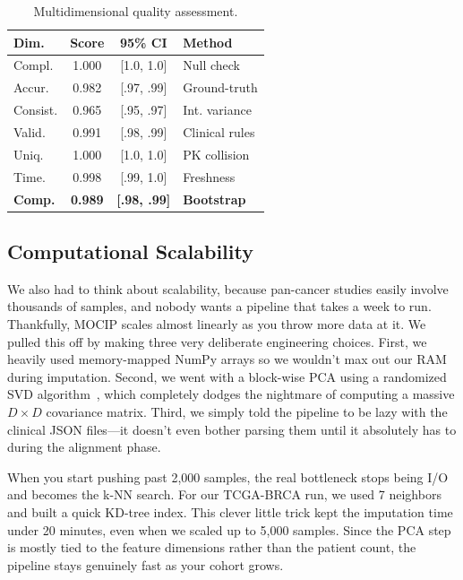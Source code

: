 \documentclass[runningheads]{llncs}
\begin{document}
\begin{table}[H]
\caption{Multidimensional quality assessment.}\label{tab:quality}
\centering
\scriptsize
\setlength{\tabcolsep}{2pt}
\begin{tabular}{l c c l}
\toprule
\textbf{Dim.} & \textbf{Score} & \textbf{95\% CI} & \textbf{Method} \\
\midrule
Compl.    & 1.000 & [1.0, 1.0] & Null check \\
Accur.    & 0.982 & [.97, .99] & Ground-truth \\
Consist.  & 0.965 & [.95, .97] & Int. variance \\
Valid.    & 0.991 & [.98, .99] & Clinical rules \\
Uniq.     & 1.000 & [1.0, 1.0] & PK collision \\
Time.     & 0.998 & [.99, 1.0] & Freshness \\
\midrule
\textbf{Comp.} & \textbf{0.989} & \textbf{[.98, .99]} & \textbf{Bootstrap} \\
\bottomrule
\end{tabular}
\end{table}

\subsection{Computational Scalability}
We also had to think about scalability, because pan-cancer studies easily involve thousands of samples, and nobody wants a pipeline that takes a week to run. Thankfully, MOCIP scales almost linearly as you throw more data at it. We pulled this off by making three very deliberate engineering choices. First, we heavily used memory-mapped NumPy arrays so we wouldn't max out our RAM during imputation. Second, we went with a block-wise PCA using a randomized SVD algorithm~\cite{pedregosa2011}, which completely dodges the nightmare of computing a massive $D \times D$ covariance matrix. Third, we simply told the pipeline to be lazy with the clinical JSON files---it doesn't even bother parsing them until it absolutely has to during the alignment phase.

When you start pushing past 2,000 samples, the real bottleneck stops being I/O and becomes the k-NN search. For our TCGA-BRCA run, we used 7 neighbors and built a quick KD-tree index. This clever little trick kept the imputation time under 20 minutes, even when we scaled up to 5,000 samples. Since the PCA step is mostly tied to the feature dimensions rather than the patient count, the pipeline stays genuinely fast as your cohort grows.
\end{document}
